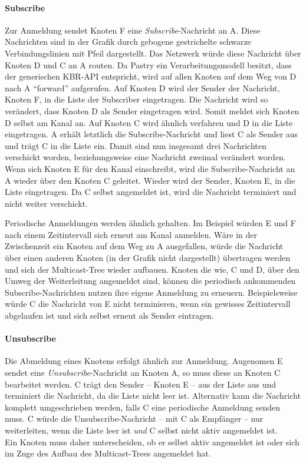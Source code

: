 \paragraph{Subscribe}
Zur Anmeldung sendet Knoten F eine \emph{Subscribe}-Nachricht an A. Diese Nachrichten sind in der Grafik durch gebogene gestrichelte schwarze Verbindungslinien mit Pfeil dargestellt. Das Netzwerk würde diese Nachricht über Knoten D und C an A routen. Da Pastry ein Verarbeitungsmodell besitzt, dass der generischen KBR-API entspricht, wird auf allen Knoten auf dem Weg von D nach A ``forward'' aufgerufen. Auf Knoten D wird der Sender der Nachricht, Knoten F, in die Liste der Subscriber eingetragen. Die Nachricht wird so verändert, dass Knoten D als Sender eingetragen wird. Somit meldet sich Knoten D selbst am Kanal an. Auf Knoten C wird ähnlich verfahren und D in die Liste eingetragen. A erhält letztlich die Subscribe-Nachricht und liest C als Sender aus und trägt C in die Liste ein. Damit sind nun insgesamt drei Nachrichten verschickt worden, beziehungsweise eine Nachricht zweimal verändert worden.\\
Wenn sich Knoten E für den Kanal einschreibt, wird die Subscribe-Nachricht an A wieder über den Knoten C geleitet. Wieder wird der Sender, Knoten E, in die Liste eingetragen. Da C selbst angemeldet ist, wird die Nachricht terminiert und nicht weiter verschickt.

Periodische Anmeldungen werden ähnlich gehalten. Im Beispiel würden E und F nach einem Zeitintervall sich erneut am Kanal anmelden. Wäre in der Zwischenzeit ein Knoten auf dem Weg zu A ausgefallen, würde die Nachricht über einen anderen Knoten (in der Grafik nicht dargestellt) übertragen werden und sich der Multicast-Tree wieder aufbauen. Knoten die wie, C und D, über den Umweg der Weiterleitung angemeldet sind, können die periodisch ankommenden Subscribe-Nachrichten nutzen ihre eigene Anmeldung zu erneuern. Beispielsweise würde C die Nachricht von E nicht terminieren, wenn ein gewisses Zeitintervall abgelaufen ist und sich selbst erneut als Sender eintragen.

\paragraph{Unsubscribe}
Die Abmeldung eines Knotens erfolgt ähnlich zur Anmeldung. Augenomen E sendet eine \emph{Unsubscribe}-Nachricht an Knoten A, so muss diese an Knoten C bearbeitet werden. C trägt den Sender -- Knoten E -- aus der Liste aus und terminiert die Nachricht, da die Liste nicht leer ist. Alternativ kann die Nachricht komplett umgeschrieben werden, falls C eine periodische Anmeldung senden muss. C würde die Unsubscribe-Nachricht -- mit C als Empfänger -- nur weiterleiten, wenn die Liste leer ist \emph{und} C selbst nicht aktiv angemeldet ist.\\
Ein Knoten muss daher unterscheiden, ob er selbst aktiv angemeldet ist oder sich im Zuge des Aufbau des Multicast-Trees angemeldet hat.


